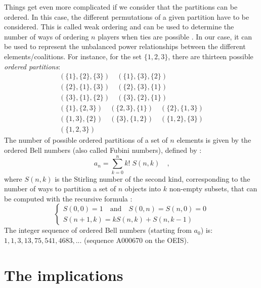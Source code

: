 Things get even more complicated if we consider that the partitions can be ordered. In this case, the different permutations of a given partition have to be considered. This is called weak ordering and can be used to determine the number of ways of ordering $n$ players when ties are possible \cite{Good1975}. In our case, it can be used to represent the unbalanced power relationships between the different elements/coalitions. For instance, for the set $\{1,2,3\}$, there are thirteen possible \emph{ordered partitions}:
\begin{gather*}
(\{1\},\{2\},\{3\}) \quad (\{1\},\{3\},\{2\}) \\ 
(\{2\},\{1\},\{3\}) \quad (\{2\},\{3\},\{1\}) \\ 
(\{3\},\{1\},\{2\}) \quad (\{3\},\{2\},\{1\}) \\
(\{1\},\{2,3\}) \quad (\{2,3\},\{1\}) \quad (\{2\},\{1,3\}) \\
(\{1,3\},\{2\}) \quad (\{3\},\{1,2\}) \quad (\{1,2\},\{3\}) \\
(\{1,2,3\})
\end{gather*}
The number of possible ordered partitions of a set of $n$ elements is given by the ordered Bell numbers (also called Fubini numbers), defined by \cite{Knuth1998}:
\begin{equation}
     a_n= \sum\limits_{k=0}^n k! \;  S(n,k) \quad \text{,}
\end{equation}
where $S(n,k)$ is the Stirling number of the second kind, corresponding to the number of ways to partition a set of $n$ objects into $k$ non-empty subsets, that can be computed with the recursive formula \cite{Graham1988}:
\begin{equation}
    \begin{cases}
    S(0,0) = 1 \quad \text{and} \quad S(0,n) = S(n,0) = 0\\
    S(n+1,k) = kS(n,k) + S(n,k-1)
    \end{cases}
\end{equation}
The integer sequence of ordered Bell numbers (starting from $a_0$) is: $1, 1, 3, 13, 75, 541, 4683,  ...$ (sequence A000670 on the OEIS).

\section*{The implications}

